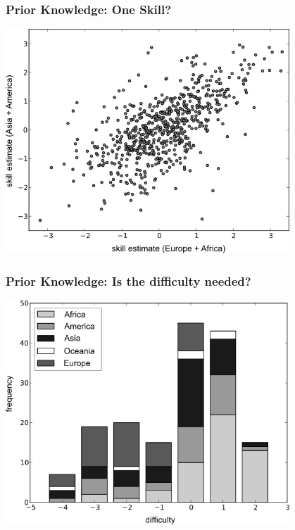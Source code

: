 \documentclass[xcolor=svgnames]{beamer}
\begin{document}
\begin{frame}
	\frametitle{Prior Knowledge: One Skill?}
	\begin{center}
		\includegraphics[width=0.8\textwidth]{2014-IA068-adaptive-practice/subskills.png}
	\end{center}
\end{frame}
\begin{frame}
	\frametitle{Prior Knowledge: Is the difficulty needed?}
	\begin{center}
		\includegraphics[width=0.8\textwidth]{2014-IA068-adaptive-practice/hist-states.png}
	\end{center}
\end{frame}
\end{document}
